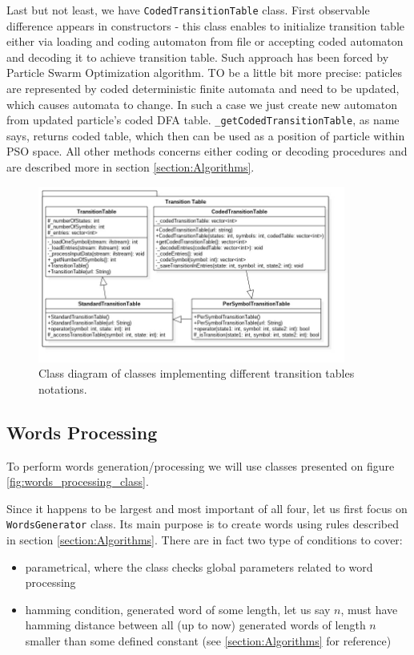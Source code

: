 \documentclass{article}
\begin{document}
Last but not least, we have \texttt{CodedTransitionTable} class. First observable difference appears in constructors - this class enables to initialize transition table either via loading and coding automaton from file or accepting coded automaton and decoding it to achieve transition table. Such approach has been forced by Particle Swarm Optimization algorithm. TO be a little bit more precise: paticles are represented by coded deterministic finite automata and need to be updated, which causes automata to change. In such a case we just create new automaton from updated particle's coded DFA table. \texttt{\_getCodedTransitionTable}, as name says, returns coded table, which then can be used as a position of particle within PSO space. All other methods concerns either coding or decoding procedures and are described more in section \ref{section:Algorithms}.

\begin{figure}[H]
	\centering
	\includegraphics[width=0.9\textwidth]{images/transition_table.jpg}
    \caption{Class diagram of classes implementing different transition tables notations.}
    \label{fig:trans_table_class}
\end{figure}


%
%
\newpage
\subsection{Words Processing} \label{subsec:words_proc}
To perform words generation/processing we will use classes presented on figure \ref{fig:words_processing_class}.

Since it happens to be largest and most important of all four, let us first focus on \texttt{WordsGenerator} class. Its main purpose is to create words using rules described in section \ref{section:Algorithms}. There are in fact two type of conditions to cover:
\begin{itemize}
\item parametrical, where the class checks global parameters related to word processing
\item hamming condition, generated word of some length, let us say $n$, must have hamming distance between all (up to now) generated words of length $n$ smaller than some defined constant (see \ref{section:Algorithms} for reference)
\end{itemize}
\end{document}
